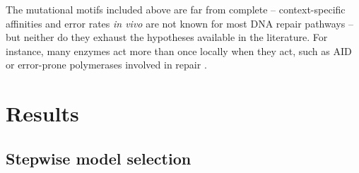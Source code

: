 \documentclass{article}
\theoremstyle{plain}
\theoremstyle{definition}
\begin{document}
The mutational motifs included above are far from complete
-- context-specific affinities and error rates \textit{in vivo}
are not known for most DNA repair pathways --
but neither do they exhaust the hypotheses available in the literature.
For instance, many enzymes act more than once locally when they act,
such as AID \citep{senavirathne2015activationinduced} or error-prone polymerases involved in repair \citep{maul2016polymerase}.


\section{Results}

\subsection{Stepwise model selection}
\end{document}
